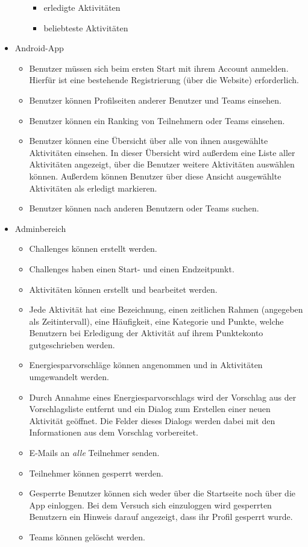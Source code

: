 \documentclass[10pt,a4paper]{article}
\begin{document}
\begin{itemize}
\begin{itemize}
\begin{itemize}
				\item erledigte Aktivitäten
				\item beliebteste Aktivitäten
			\end{itemize}
		\end{itemize}
		\item Android-App
		\begin{itemize}
			\item Benutzer müssen sich beim ersten Start mit ihrem Account anmelden. Hierfür ist eine bestehende Registrierung (über die Website) erforderlich.
			\item Benutzer können Profilseiten anderer Benutzer und Teams einsehen.
			\item Benutzer können ein Ranking von Teilnehmern oder Teams einsehen.
			\item Benutzer können eine Übersicht über alle von ihnen ausgewählte Aktivitäten einsehen. In dieser Übersicht wird außerdem eine Liste aller Aktivitäten angezeigt, über die Benutzer weitere Aktivitäten auswählen können. Außerdem können Benutzer über diese Ansicht ausgewählte Aktivitäten als erledigt markieren.
			\item Benutzer können nach anderen Benutzern oder Teams suchen. 
		\end{itemize}
		\item Adminbereich
		\begin{itemize}
			\item Challenges können erstellt werden.
                        \item Challenges haben einen Start- und einen Endzeitpunkt.
			\item Aktivitäten können erstellt und bearbeitet werden.
                        \item Jede Aktivität hat eine Bezeichnung, einen zeitlichen Rahmen (angegeben als Zeitintervall), eine Häufigkeit, eine Kategorie und Punkte, welche Benutzern bei Erledigung der Aktivität auf ihrem Punktekonto gutgeschrieben werden.
			\item Energiesparvorschläge können angenommen und in Aktivitäten umgewandelt werden.
                        \item Durch Annahme eines Energiesparvorschlags wird der Vorschlag aus der Vorschlagsliste entfernt und ein Dialog zum Erstellen einer neuen Aktivität geöffnet. Die Felder dieses Dialogs werden dabei mit den Informationen aus dem Vorschlag vorbereitet.
			\item E-Mails an \emph{alle} Teilnehmer senden.
			\item Teilnehmer können gesperrt werden.
                        \item Gesperrte Benutzer können sich weder über die Startseite noch über die App einloggen. Bei dem Versuch sich einzuloggen wird gesperrten Benutzern ein Hinweis darauf angezeigt, dass ihr Profil gesperrt wurde.
                        \item Teams können gelöscht werden.
		\end{itemize}
	\end{itemize}
\end{document}
